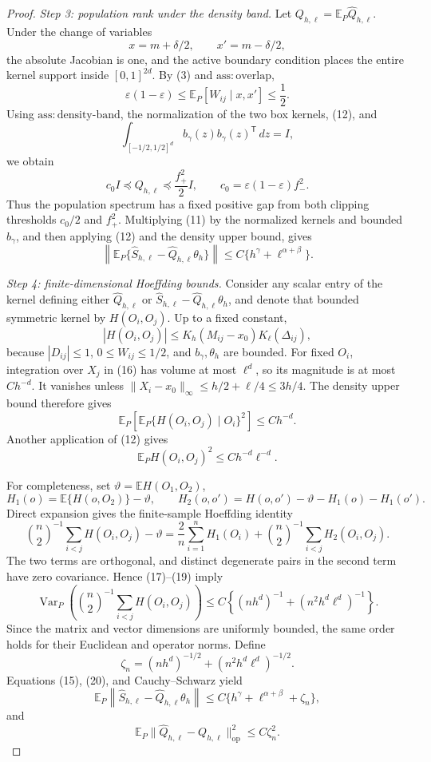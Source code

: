 \documentclass{article}
\begin{document}
\begin{proof}
\emph{Step 3: population rank under the density band.}
Let \(Q_{h,\ell}=\mathbb E_P\widehat Q_{h,\ell}\).  Under the change of variables
\[
x=m+\delta/2,
\qquad x'=m-\delta/2,
\tag{12}
\]
the absolute Jacobian is one, and the active boundary condition places the entire kernel support inside \([0,1]^{2d}\).  By (3) and \(\mathrm{ass:overlap}\),
\[
\varepsilon(1-\varepsilon)
\leq\mathbb E_P[W_{ij}\mid x,x']\leq\frac12.
\tag{13}
\]
Using \(\mathrm{ass:density\mbox{-}band}\), the normalization of the two box kernels, (12), and
\[
\int_{[-1/2,1/2]^d}b_\gamma(z)b_\gamma(z)^{\mathsf T}\,dz=I,
\]
we obtain
\[
c_0I\preceq Q_{h,\ell}\preceq\frac{f_+^2}{2}I,
\qquad c_0=\varepsilon(1-\varepsilon)f_-^2.
\tag{14}
\]
Thus the population spectrum has a fixed positive gap from both clipping thresholds \(c_0/2\) and \(f_+^2\).  Multiplying (11) by the normalized kernels and bounded \(b_\gamma\), and then applying (12) and the density upper bound, gives
\[
\left\|
\mathbb E_P\{\widehat S_{h,\ell}-\widehat Q_{h,\ell}\theta_h\}
\right\|
\leq C\{h^\gamma+\ell^{\alpha+\beta}\}.
\tag{15}
\]

\emph{Step 4: finite-dimensional Hoeffding bounds.}
Consider any scalar entry of the kernel defining either \(\widehat Q_{h,\ell}\) or \(\widehat S_{h,\ell}-\widehat Q_{h,\ell}\theta_h\), and denote that bounded symmetric kernel by \(H(O_i,O_j)\).  Up to a fixed constant,
\[
|H(O_i,O_j)|
\leq K_h(M_{ij}-x_0)K_\ell(\Delta_{ij}),
\tag{16}
\]
because \(|D_{ij}|\leq1\), \(0\leq W_{ij}\leq1/2\), and \(b_\gamma,\theta_h\) are bounded.  For fixed \(O_i\), integration over \(X_j\) in (16) has volume at most \(\ell^d\), so its magnitude is at most \(Ch^{-d}\).  It vanishes unless \(\lVert X_i-x_0\rVert_\infty\leq h/2+\ell/4\leq3h/4\).  The density upper bound therefore gives
\[
\mathbb E_P\left[
\mathbb E_P\{H(O_i,O_j)\mid O_i\}^2
\right]\leq Ch^{-d}.
\tag{17}
\]
Another application of (12) gives
\[
\mathbb E_PH(O_i,O_j)^2\leq Ch^{-d}\ell^{-d}.
\tag{18}
\]

For completeness, set \(\vartheta=\mathbb EH(O_1,O_2)\),
\[
H_1(o)=\mathbb E\{H(o,O_2)\}-\vartheta,
\qquad
H_2(o,o')=H(o,o')-\vartheta-H_1(o)-H_1(o').
\]
Direct expansion gives the finite-sample Hoeffding identity
\[
\binom n2^{-1}\sum_{i<j}H(O_i,O_j)-\vartheta
=\frac2n\sum_{i=1}^nH_1(O_i)
+\binom n2^{-1}\sum_{i<j}H_2(O_i,O_j).
\tag{19}
\]
The two terms are orthogonal, and distinct degenerate pairs in the second term have zero covariance.  Hence (17)--(19) imply
\[
\operatorname{Var}_P\!\left(
\binom n2^{-1}\sum_{i<j}H(O_i,O_j)
\right)
\leq C\left\{(nh^d)^{-1}+(n^2h^d\ell^d)^{-1}\right\}.
\tag{20}
\]
Since the matrix and vector dimensions are uniformly bounded, the same order holds for their Euclidean and operator norms.  Define
\[
\zeta_n=(nh^d)^{-1/2}+(n^2h^d\ell^d)^{-1/2}.
\tag{21}
\]
Equations (15), (20), and Cauchy--Schwarz yield
\[
\mathbb E_P\left\|
\widehat S_{h,\ell}-\widehat Q_{h,\ell}\theta_h
\right\|
\leq C\{h^\gamma+\ell^{\alpha+\beta}+\zeta_n\},
\tag{22}
\]
and
\[
\mathbb E_P\lVert\widehat Q_{h,\ell}-Q_{h,\ell}\rVert_{\mathrm{op}}^2
\leq C\zeta_n^2.
\tag{23}
\]


\end{proof}
\end{document}
